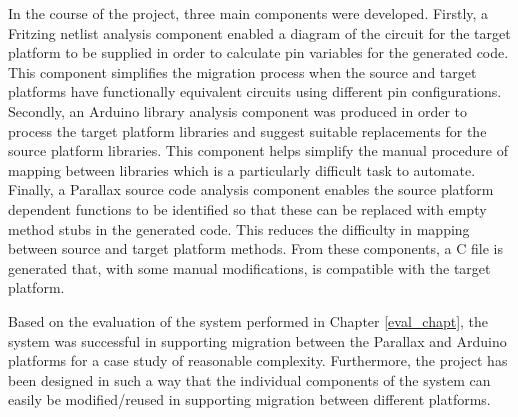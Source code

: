 \documentclass{UoYCSproject}
\begin{document}
In the course of the project, three main components were developed. Firstly, a Fritzing netlist analysis component enabled a diagram of the circuit for the target platform to be supplied in order to calculate pin variables for the generated code. This component simplifies the migration process when the source and target platforms have functionally equivalent circuits using different pin configurations. Secondly, an Arduino library analysis component was produced in order to process the target platform libraries and suggest suitable replacements for the source platform libraries. This component helps simplify the manual procedure of mapping between libraries which is a particularly difficult task to automate. Finally, a Parallax source code analysis component enables the source platform dependent functions to be identified so that these can be replaced with empty method stubs in the generated code. This reduces the difficulty in mapping between source and target platform methods. From these components, a C file is generated that, with some manual modifications, is compatible with the target platform.

Based on the evaluation of the system performed in Chapter \ref{eval_chapt}, the system was successful in supporting migration between the Parallax and Arduino platforms for a case study of reasonable complexity. Furthermore, the project has been designed in such a way that the individual components of the system can easily be modified/reused in supporting migration between different platforms.
\end{document}
